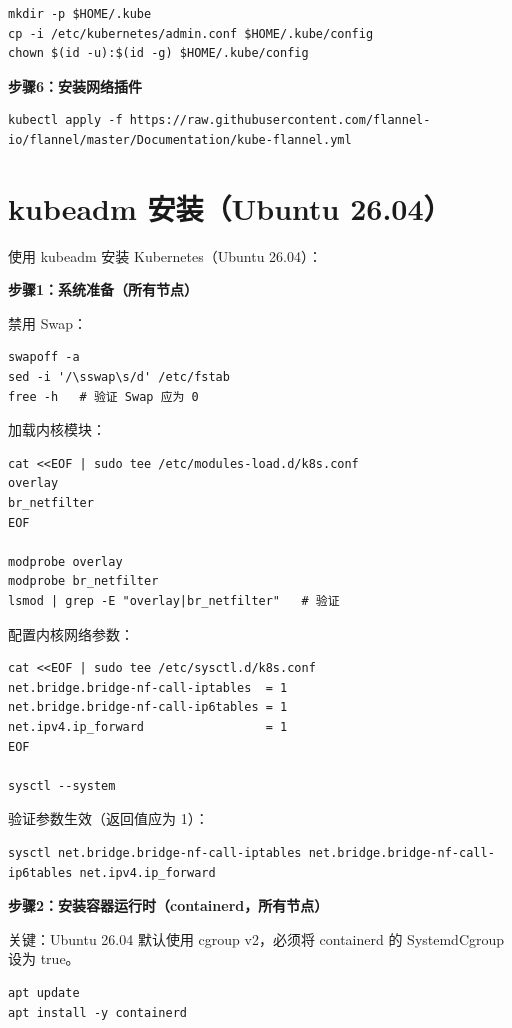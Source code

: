 \documentclass[12pt,UTF8]{ctexbook}
\begin{document}
\begin{lstlisting}
mkdir -p $HOME/.kube
cp -i /etc/kubernetes/admin.conf $HOME/.kube/config
chown $(id -u):$(id -g) $HOME/.kube/config
\end{lstlisting}

\textbf{步骤6：安装网络插件}

\begin{lstlisting}
kubectl apply -f https://raw.githubusercontent.com/flannel-io/flannel/master/Documentation/kube-flannel.yml
\end{lstlisting}

\section{kubeadm 安装（Ubuntu 26.04）}
\label{sec:kubeadm_install_ubuntu}

使用 kubeadm 安装 Kubernetes（Ubuntu 26.04）：

\textbf{步骤1：系统准备（所有节点）}

禁用 Swap：
\begin{lstlisting}
swapoff -a
sed -i '/\sswap\s/d' /etc/fstab
free -h   # 验证 Swap 应为 0
\end{lstlisting}

加载内核模块：
\begin{lstlisting}
cat <<EOF | sudo tee /etc/modules-load.d/k8s.conf
overlay
br_netfilter
EOF

modprobe overlay
modprobe br_netfilter
lsmod | grep -E "overlay|br_netfilter"   # 验证
\end{lstlisting}

配置内核网络参数：
\begin{lstlisting}
cat <<EOF | sudo tee /etc/sysctl.d/k8s.conf
net.bridge.bridge-nf-call-iptables  = 1
net.bridge.bridge-nf-call-ip6tables = 1
net.ipv4.ip_forward                 = 1
EOF

sysctl --system
\end{lstlisting}

验证参数生效（返回值应为 1）：
\begin{lstlisting}
sysctl net.bridge.bridge-nf-call-iptables net.bridge.bridge-nf-call-ip6tables net.ipv4.ip_forward
\end{lstlisting}

\textbf{步骤2：安装容器运行时（containerd，所有节点）}

关键：Ubuntu 26.04 默认使用 cgroup v2，必须将 containerd 的 SystemdCgroup 设为 true。

\begin{lstlisting}
apt update
apt install -y containerd
\end{lstlisting}
\end{document}
